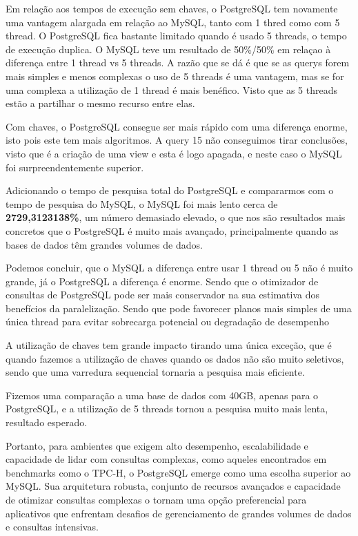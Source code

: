 \documentclass{article}
\begin{document}
Em relação aos tempos de execução sem chaves, o PostgreSQL tem novamente uma vantagem alargada em relação ao MySQL, tanto com 1 thred como com 5 thread. O PostgreSQL fica bastante limitado quando é usado 5 threads, o tempo de execução duplica. O MySQL teve um resultado de 50\%/50\% em relaçao à diferença entre 1 thread vs 5 threads. A razão que se dá é que se as querys forem mais simples e menos complexas o uso de 5 threads é uma vantagem, mas se for uma complexa a utilização de 1 thread é mais benéfico. Visto que as 5 threads estão a partilhar o mesmo recurso entre elas.

Com chaves, o PostgreSQL consegue ser mais rápido com uma diferença enorme, isto pois este tem mais algoritmos. A query 15 não conseguimos tirar conclusões, visto que é a criação de uma view e esta é logo apagada, e neste caso o MySQL foi surpreendentemente superior.

Adicionando o tempo de pesquisa total do PostgreSQL e compararmos com o tempo de pesquisa do MySQL, o MySQL foi mais lento cerca de \textbf{2729,3123138\%}, um número demasiado elevado, o que nos são resultados mais concretos que o PostgreSQL é muito mais avançado, principalmente quando as bases de dados têm grandes volumes de dados.

Podemos concluir, que o MySQL a diferença entre usar 1 thread ou 5 não é muito grande, já o PostgreSQL a diferença é enorme. Sendo que  o otimizador de consultas
de PostgreSQL pode ser mais conservador na sua estimativa dos benefícios da paralelização. Sendo
que pode favorecer planos mais simples de uma única thread para evitar sobrecarga potencial ou
degradação de desempenho

A utilização de chaves tem grande impacto tirando uma única exceção, que é quando fazemos a utilização de chaves quando os dados não são muito seletivos, sendo que uma varredura sequencial tornaria a pesquisa mais eficiente.

Fizemos uma comparação a uma base de dados com 40GB, apenas para o PostgreSQL, e a utilização de 5 threads tornou a pesquisa muito mais lenta, resultado esperado.

Portanto, para ambientes que exigem alto desempenho, escalabilidade e capacidade de lidar com consultas complexas, como aqueles encontrados em benchmarks como o TPC-H, o PostgreSQL emerge como uma escolha superior ao MySQL. Sua arquitetura robusta, conjunto de recursos avançados e capacidade de otimizar consultas complexas o tornam uma opção preferencial para aplicativos que enfrentam desafios de gerenciamento de grandes volumes de dados e consultas intensivas.
\end{document}
